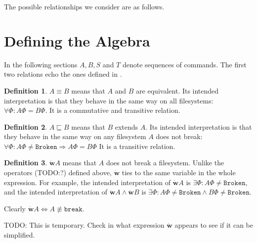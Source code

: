 \documentclass[12pt]{article}
\newcommand{\empt}{\bot}
\newcommand{\fsbroken}{\mathtt{Broken}} %
\newcommand{\FS}{\Phi} %
\newcommand{\pp}{p\!\!\uparrow} %
\newcommand{\cbrk}{\mathtt{break}}
\newcommand{\fscommand}[2]{{#1#2}}
\newcommand{\fsregcommandchar}[1]{\mathtt{#1}}
\newcommand{\fsregcommand}[2]{\fscommand{\fsregcommandchar{#1}}{\fsregcommandchar{#2}}}
\newcommand{\cfb}{\fsregcommand{F}{\empt}}
\newcommand{\cdb}{\fsregcommand{D}{\empt}}
\newcommand{\eqext}{\sqsubseteq}
\newcommand{\nequiv}{\not\equiv}
\newcommand{\works}{\dot{\mathbf{w}}}
\theoremstyle{definition}
\newtheorem{mydef}{Definition}
\begin{document}
The possible relationships we
consider are as follows.




\section{Defining the Algebra}

In the following sections $A,B,S$ and $T$ denote sequences of commands.
The first two relations echo the ones defined in \cite{NREC:alg}.

\begin{mydef}
$A\equiv B$ means that $A$ and $B$ are equivalent.
Its intended interpretation is that they behave in the same way on
all filesystems: $\forall \FS: A\FS=B\FS$.
It is a commutative and transitive relation.
\end{mydef}

\begin{mydef}
$A\eqext B$ means that $B$ extends $A$.
Its intended interpretation is that they behave in the same way
on any filesystem $A$ does not break:
$\forall \FS: A\FS\neq\fsbroken\Rightarrow A\FS=B\FS$
It is a transitive relation.
\end{mydef}

\begin{mydef}
$\works A$ means that $A$ does not break a filesystem.
Unlike the operators (TODO:?) defined above,
$\works$ ties to the same variable in the whole expression.
For example, the intended interpretation of
$\works A$ is $\exists \FS: A\FS\neq\fsbroken$,
and the intended interpretation of
$\works A\wedge\works B$ is $\exists \FS: A\FS\neq\fsbroken \wedge B\FS\neq\fsbroken$.

Clearly $\works A\Leftrightarrow A\nequiv\cbrk$.

TODO: This is temporary. Check in what expression $\works$ appears
to see if it can be simplified.
\end{mydef}
\end{document}
